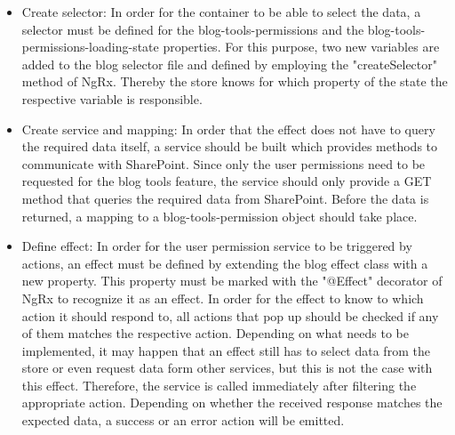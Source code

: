 \documentclass[Bachelor,BIF,english]{twbook}
\begin{document}
\begin{itemize}
\item Create selector: In order for the container to be able to select the data, a selector must be defined for the blog-tools-permissions and the blog-tools-permissions-loading-state properties. For this purpose, two new variables are added to the blog selector file and defined by employing the "createSelector" method of NgRx. Thereby the store knows for which property of the state the respective variable is responsible.
\item Create service and mapping: In order that the effect does not have to query the required data itself, a service should be built which provides methods to communicate with SharePoint. Since only the user permissions need to be requested for the blog tools feature, the service should only provide a GET method that queries the required data from SharePoint. Before the data is returned, a mapping to a blog-tools-permission object should take place.
\item Define effect: In order for the user permission service to be triggered by actions, an effect must be defined by extending the blog effect class with a new property. This property must be marked with the "@Effect" decorator of NgRx to recognize it as an effect. In order for the effect to know to which action it should respond to, all actions that pop up should be checked if any of them matches the respective action. Depending on what needs to be implemented, it may happen that an effect still has to select data from the store or even request data form other services, but this is not the case with this effect. Therefore, the service is called immediately after filtering the appropriate action. Depending on whether the received response matches the expected data, a success or an error action will be emitted.
\end{itemize}
\end{document}
